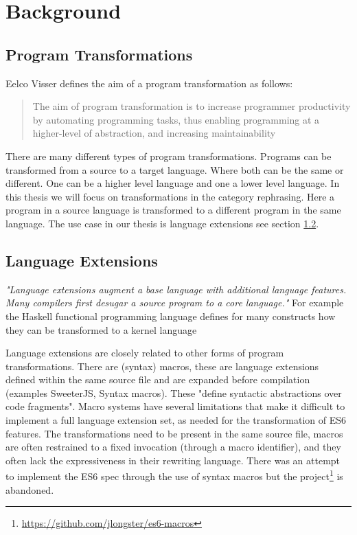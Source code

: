 
\chapter{Background} %

\label{Chapter2}


\section{Program Transformations}

Eelco Visser defines the aim of a program transformation as follows:

\blockquote[\cite{Visser2001}]{The aim of program transformation is to increase programmer productivity by automating programming tasks, thus enabling programming at a higher-level of abstraction, and increasing maintainability}

There are many different types of program transformations. Programs can be transformed from a source to a target language. Where both can be the same or different. One can be a higher level language and one a lower level language. In this thesis we will focus on transformations in the category rephrasing\cite{Visser2001}. Here a program in a source language is transformed to a different program in the same language. The use case in our thesis is language extensions see section \ref{lang-ext}.

\section{Language Extensions} \label{lang-ext}
\textit{"Language extensions augment a base language with additional language features. Many compilers first desugar a source program to a core language."}\cite{Erdweg2014} For example the Haskell functional programming language defines for many constructs how they can be transformed to a kernel language\cite{PeytonJones}

Language extensions are closely related to other forms of program transformations. There are (syntax) macros\cite{Leavenworth1966}, these are language extensions defined within the same source file and are expanded before compilation (examples SweeterJS\cite{Disney2014}, Syntax macros\cite{Weise1993}). These "define syntactic abstractions over code fragments"\cite{Bravenboer2004}. Macro systems have several limitations that make it difficult to implement a full language extension set, as needed for the transformation of ES6 features. The transformations need to be present in the same source file, macros are often restrained to a fixed invocation (through a macro identifier), and they often lack the expressiveness in their rewriting language\cite{Bravenboer2004}. There was an attempt to implement the ES6 spec through the use of syntax macros but the project\footnote{\url{https://github.com/jlongster/es6-macros}} is abandoned.

